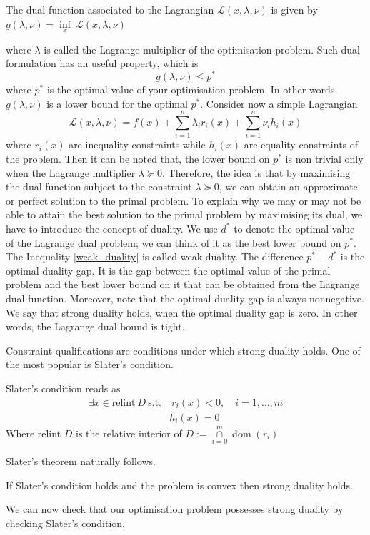 \begin{definition}
    The dual function associated to the Lagrangian $\mathcal{L}(x,\lambda, \nu)$ is given by $g(\lambda, \nu)=\underset{x}\inf \ \mathcal{L}(x,\lambda, \nu)$
\end{definition}
where $\lambda$ is called the Lagrange multiplier of the optimisation problem. Such dual formulation has an useful property, which is \begin{equation}\label{weak_duality}
    g(\lambda, \nu)\leq p^*
\end{equation}
where $p^*$ is the optimal value of your optimisation problem. In other words $g(\lambda, \nu)$ is a lower bound for the optimal $p^*$.
Consider now a simple Lagrangian $$\mathcal{L}(x,\lambda, \nu)=f(x)+\sum\limits_{i=1}^n \lambda_i r_i(x) +\sum\limits_{i=1}^{n} \nu_i h_i(x)$$
where $r_i(x)$ are inequality constraints while $h_i(x)$ are equality constraints of the problem. Then it can be noted that, the lower bound on $p^*$ is non trivial only when the Lagrange multiplier $\lambda \succeq 0$.
Therefore, the idea is that by maximising the dual function subject to the constraint $\lambda \succeq 0$, we can obtain an approximate or perfect solution to the primal problem.
To explain why we may or may not be able to attain the best solution to the primal problem by maximising its dual, we have to introduce the concept of duality.
We use $d^*$ to denote the optimal value of the Lagrange dual problem; we can think of it as the best lower bound on $p^*$. 
The Inequality \ref{weak_duality} is called weak duality. The difference $p^*-d^*$ is the optimal duality gap. It is the gap between the optimal value of the primal problem and the best lower bound on it that can be obtained from the Lagrange dual function. Moreover, note that the optimal duality gap is always nonnegative.
We say that strong duality holds, when the optimal duality gap is zero. In other words, the Lagrange dual bound is tight.

Constraint qualifications are conditions under which strong duality holds. One of the most popular is Slater's condition.
\begin{proposition}
    Slater's condition reads as
    \begin{equation}\label{slater_condition}
        \begin{aligned}
            \exists x \in \textrm{relint} \ D \ \textrm{s.t.} & \ r_i(x)<0, \quad i=1, \dots, m \\
            & h_i(x)=0
        \end{aligned}
    \end{equation}
    Where relint $D$ is the relative interior of $ D:=\underset{i=0}{\overset{m}{\cap}} \operatorname {dom} (r_{i})$
\end{proposition}
Slater's theorem naturally follows.
\begin{theorem}
    If Slater's condition holds and the problem is convex then strong duality holds.
\end{theorem}
We can now check that our optimisation problem possesses strong duality by checking Slater's condition.

